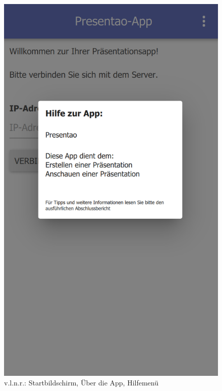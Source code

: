 \begin{figure}[ht!]
\begin{minipage}{0.31\linewidth}
		\includegraphics[scale=0.5]{GUI/Bilder/1-0-1-Startbildschirm-PopUP-Hilfe.PNG}
	\end{minipage}
	\caption{v.l.n.r.: Startbildschirm, Über die App, Hilfemenü{\tiny}}
	\label{client:Appstart}
\end{figure}

\newpage


